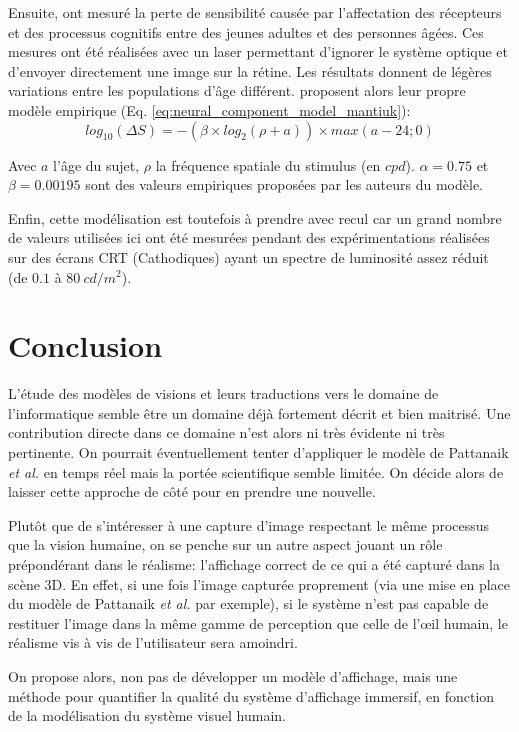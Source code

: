 	\par Ensuite, \citep{burton_aging_1993} ont mesuré la perte de sensibilité causée par l'affectation des récepteurs et des processus cognitifs entre des jeunes adultes et des personnes âgées. Ces mesures ont été réalisées avec un laser permettant d'ignorer le système optique et d'envoyer directement une image sur la rétine. Les résultats donnent de légères variations entre les populations d'âge différent. \citep{mantiuk_human_2015} proposent alors leur propre modèle empirique (Eq. \ref{eq:neural_component_model_mantiuk}):
	\begin{equation}
		log_{10}(\Delta S) = - (\beta \times log_2(\rho + a)) \times max(a-24;0)
		\label{eq:neural_component_model_mantiuk}
	\end{equation}
	
	\par Avec $a$ l'âge du sujet, $\rho$ la fréquence spatiale du stimulus (en $cpd$). $\alpha = 0.75$ et $\beta = 0.00195$ sont des valeurs empiriques proposées par les auteurs du modèle.
	
	\par Enfin, cette modélisation est toutefois à prendre avec recul car un grand nombre de valeurs utilisées ici ont été mesurées pendant des expérimentations réalisées sur des écrans CRT (Cathodiques) ayant un spectre de luminosité assez réduit (de $0.1$ à $80~cd/m^2$).
	
	\chapter*{Conclusion}
	\par L'étude des modèles de visions et leurs traductions vers le domaine de l'informatique semble être un domaine déjà fortement décrit et bien maitrisé. Une contribution directe dans ce domaine n'est alors ni très évidente ni très pertinente. On pourrait éventuellement tenter d'appliquer le modèle de Pattanaik \textit{et al.} en temps réel mais la portée scientifique semble limitée. On décide alors de laisser cette approche de côté pour en prendre une nouvelle.
	
	\par Plutôt que de s'intéresser à une capture d'image respectant le même processus que la vision humaine, on se penche sur un autre aspect jouant un rôle prépondérant dans le réalisme: l'affichage correct de ce qui a été capturé dans la scène 3D. En effet, si une fois l'image capturée proprement (via une mise en place du modèle de Pattanaik \textit{et al.} par exemple), si le système n'est pas capable de restituer l'image dans la même gamme de perception que celle de l'œil humain, le réalisme vis à vis de l'utilisateur sera amoindri.
	
	\par On propose alors, non pas de développer un modèle d'affichage, mais une méthode pour quantifier la qualité du système d'affichage immersif, en fonction de la modélisation du système visuel humain.